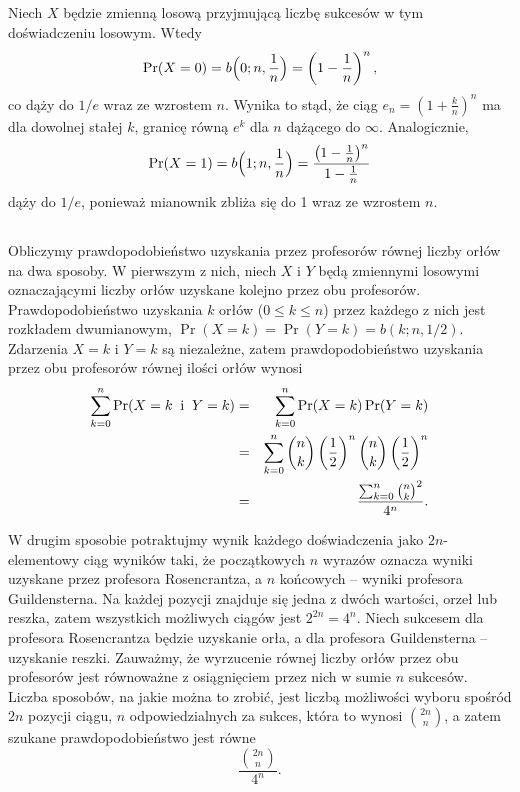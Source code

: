 \subsection{} %
Niech $X$ będzie zmienną losową przyjmującą liczbę sukcesów w tym doświadczeniu losowym. Wtedy
\[
	\Pr(X=0) = b\Bigl(0;n,\frac{1}{n}\Bigr) = \left(1-\frac{1}{n}\right)^n,
\]
co dąży do $1/e$ wraz ze wzrostem $n$. Wynika to stąd, że ciąg $e_n=\left(1+\frac{k}{n}\right)^n$ ma dla dowolnej stałej $k$, granicę równą $e^k$ dla $n$ dążącego do $\infty$.
Analogicznie,
\[
	\Pr(X=1) = b\Bigl(1;n,\frac{1}{n}\Bigr) = \frac{\left(1-\frac{1}{n}\right)^n}{1-\frac{1}{n}}
\]
dąży do $1/e$, ponieważ mianownik zbliża się do 1 wraz ze wzrostem $n$.

\subsection{} %
Obliczymy prawdopodobieństwo uzyskania przez profesorów równej liczby orłów na dwa sposoby. W pierwszym z nich, niech $X$ i $Y$ będą zmiennymi losowymi oznaczającymi liczby orłów uzyskane kolejno przez obu profesorów. Prawdopodobieństwo uzyskania $k$ orłów ($0\le k\le n$) przez każdego z nich jest rozkładem dwumianowym, $\Pr(X=k)=\Pr(Y=k)=b(k;n,1/2)$. Zdarzenia $X=k$ i $Y=k$ są niezależne, zatem prawdopodobieństwo uzyskania przez obu profesorów równej ilości orłów wynosi
\begin{eqnarray*}
	\sum_{k=0}^n\Pr(X=k\;\;\hbox{i}\;\;Y=k) &=& \sum_{k=0}^n\Pr(X=k)\Pr(Y=k) \\
	&=& \sum_{k=0}^n\binom{n}{k}\left(\frac{1}{2}\right)^n\binom{n}{k}\left(\frac{1}{2}\right)^n \\
	&=& \frac{\sum_{k=0}^n\binom{n}{k}^2}{4^n}.
\end{eqnarray*}

W drugim sposobie potraktujmy wynik każdego doświadczenia jako $2n$-elementowy ciąg wyników taki, że początkowych $n$ wyrazów oznacza wyniki uzyskane przez profesora Rosencrantza, a $n$ końcowych -- wyniki profesora Guildensterna. Na każdej pozycji znajduje się jedna z dwóch wartości, orzeł lub reszka, zatem wszystkich możliwych ciągów jest $2^{2n}=4^n$. Niech sukcesem dla profesora Rosencrantza będzie uzyskanie orła, a dla profesora Guildensterna -- uzyskanie reszki. Zauważmy, że wyrzucenie równej liczby orłów przez obu profesorów jest równoważne z osiągnięciem przez nich w sumie $n$ sukcesów. Liczba sposobów, na jakie można to zrobić, jest liczbą możliwości wyboru spośród $2n$ pozycji ciągu, $n$ odpowiedzialnych za sukces, która to wynosi $\binom{2n}{n}$, a zatem szukane prawdopodobieństwo jest równe
\[
	\frac{\binom{2n}{n}}{4^n}.
\]

